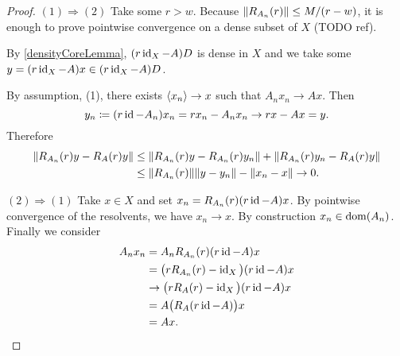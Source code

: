 \begin{proof}
$(1) \Rightarrow (2)$ Take some $r > w$. Because $\lVert R_{A_n}(r)\rVert\leq M/(r-w)$, it is enough to prove pointwise convergence on a dense subset of $X$ (TODO ref).

By \ref{densityCoreLemma}, $(r\operatorname{id}_X - A)D$ is dense in $X$ and we take some $y = (r\operatorname{id}_X - A)x\in (r\operatorname{id}_X - A)D$.

By assumption, (1), there exists $\left\langle x_n \right\rangle \to x$ such that $A_nx_n \to Ax$. Then
\[ y_n\coloneqq (r\operatorname{id} - A_n)x_n = r x_n - A_nx_n \to r x - Ax = y. \]
Therefore
\begin{align*}
\lVert R_{A_n}(r)y - R_A(r)y\rVert &\leq \lVert R_{A_n}(r)y - R_{A_n}(r)y_n\rVert + \lVert R_{A_n}(r)y_n - R_A(r)y\rVert \\
&\leq \lVert R_{A_n}(r)\rVert\lVert y-y_n\rVert - \lVert x_n - x\rVert \to 0.
\end{align*}

$(2) \Rightarrow (1)$ Take $x\in X$ and set $x_n = R_{A_n}(r)(r\operatorname{id} - A)x$. By pointwise convergence of the resolvents, we have $x_n\to x$. By construction $x_n\in\operatorname{dom}(A_n)$. Finally we consider
\begin{align*}
A_nx_n &= A_nR_{A_n}(r)(r\operatorname{id} - A)x \\
&= \big(rR_{A_n}(r) - \operatorname{id}_X\big)(r\operatorname{id} - A)x \\
&\to \big(rR_{A}(r) - \operatorname{id}_X\big)(r\operatorname{id} - A)x \\
&= A\big(R_A(r\operatorname{id} - A)\big)x \\
&= Ax.
\end{align*}


\end{proof}
